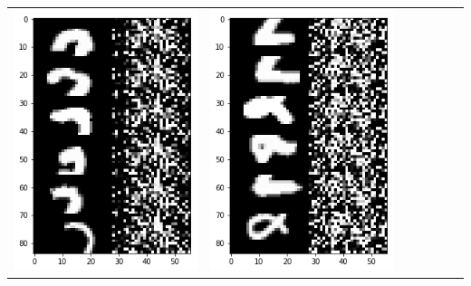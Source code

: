 \documentclass[12pt]{report} %
\begin{document}
\begin{tabular}{m{0.7cm}m{2.4cm}m{2.4cm}m{2.4cm}m{2.4cm}m{2.4cm}m{2.4cm}}
\includegraphics[scale=0.3]{pictures/M2_2_up.png} & \includegraphics[scale=0.3]{pictures/M2_2_down.png}\\

\end{tabular}
\end{document}
